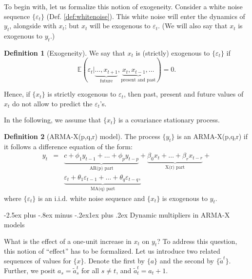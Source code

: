 \documentclass[
  11pt,
]{book}
\makeatletter
\renewcommand\subsection{\@startsection{subsection}{2}{\z@}
  {-2.5ex plus -.8ex minus -.2ex}{1ex plus .2ex}
  {\normalfont\large\bfseries\color{TextbookInk}}}
\theoremstyle{definition}
\newtheorem{definition}{Definition}[chapter]
\theoremstyle{definition}
\theoremstyle{definition}
\theoremstyle{definition}
\theoremstyle{remark}
\makeatother
\begin{document}
To begin with, let us formalize this notion of exogeneity. Consider a white noise sequence \(\{\varepsilon_t\}\) (Def. \ref{def:whitenoise}). This white noise will enter the dynamics of \(y_t\), alongside with \(x_t\); but \(x_t\) will be exogenous to \(\varepsilon_t\). (We will also say that \(x_t\) is exogenous to \(y_t\).)

\begin{definition}[Exogeneity]
\protect\hypertarget{def:exogeneity}{}\label{def:exogeneity}We say that \(x_t\) is (strictly) exogenous to \(\{\varepsilon_t\}\) if
\[
\mathbb{E}(\varepsilon_t|\underbrace{\dots,x_{t+1}}_{\mbox{future}},\underbrace{x_t,x_{t-1},\dots}_{\mbox{present and past}}) = 0.
\]
\end{definition}

Hence, if \(\{x_t\}\) is strictly exogenous to \(\varepsilon_t\), then past, present and future values of \(x_t\) do not allow to predict the \(\varepsilon_t\)'s.

In the following, we assume that \(\{x_t\}\) is a covariance stationary process.

\begin{definition}[ARMA-X(p,q,r) model]
\protect\hypertarget{def:ARMAX}{}\label{def:ARMAX}The process \(\{y_t\}\) is an ARMA-X(p,q,r) if it follows a difference equation of the form:
\begin{eqnarray}
y_t &=& \underbrace{c + \phi_1 y_{t-1} + \dots + \phi_p y_{t-p}}_{\mbox{AR(p) part}} + \underbrace{\beta_0 x_t + \dots + \beta_{r} x_{t-r}}_{\mbox{X(r) part}} + \nonumber \\
&&\underbrace{\varepsilon_t + \theta_1\varepsilon_{t-1}+\dots +\theta_{q}\varepsilon_{t-q},}_{\mbox{MA(q) part}} \label{eq:DLM}
\end{eqnarray}
where \(\{\varepsilon_t\}\) is an i.i.d. white noise sequence and \(\{x_t\}\) is exogenous to \(y_t\).
\end{definition}

\subsection{Dynamic multipliers in ARMA-X models}\label{ARMAXDynamic}

What is the effect of a one-unit increase in \(x_t\) on \(y_t\)? To address this question, this notion of ``effect'' has to be formalized. Let us introduce two related sequences of values for \(\{x\}\). Denote the first by \(\{a\}\) and the second by \(\{\tilde{a}^t\}\). Further, we posit \(a_s = \tilde{a}_s^t\) for all \(s \ne t\), and \(\tilde{a}_t^t = a_t+1\).
\end{document}
